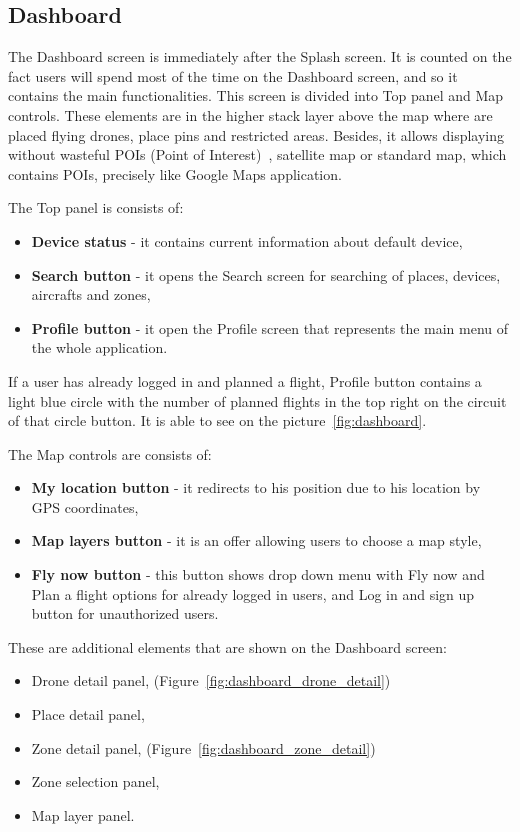 \subsection{Dashboard}\label{subsec:dashboard2}

The Dashboard screen is immediately after the Splash screen.
It is counted on the fact users will spend most of the time on the Dashboard screen, and so it contains the main functionalities.
This screen is divided into Top panel and Map controls.
These elements are in the higher stack layer above the map where are placed flying drones, place pins and restricted areas.
Besides, it allows displaying without wasteful POIs (Point of Interest)~\cite{poi}, satellite map or standard map, which contains POIs, precisely like Google Maps application.

The Top panel is consists of:
\begin{itemize}
    \item \textbf{Device status} - it contains current information about default device,
    \item \textbf{Search button} - it opens the Search screen for searching of places, devices, aircrafts and zones,
    \item \textbf{Profile button} - it open the Profile screen that represents the main menu of the whole application.
\end{itemize}
If a user has already logged in and planned a flight, Profile button contains a light blue circle with the number of planned flights in the top right on the circuit of that circle button.
It is able to see on the picture~\ref{fig:dashboard}.

The Map controls are consists of:
\begin{itemize}
    \item \textbf{My location button} - it redirects to his position due to his location by GPS coordinates,
    \item \textbf{Map layers button} - it is an offer allowing users to choose a map style,
    \item \textbf{Fly now button} - this button shows drop down menu with Fly now and Plan a flight options for already logged in users, and Log in and sign up button for unauthorized users.
\end{itemize}
\newpage
These are additional elements that are shown on the Dashboard screen:
\begin{itemize}
    \item Drone detail panel, (Figure~\ref{fig:dashboard_drone_detail})
    \item Place detail panel,
    \item Zone detail panel, (Figure~\ref{fig:dashboard_zone_detail})
    \item Zone selection panel,
    \item Map layer panel.
\end{itemize}

